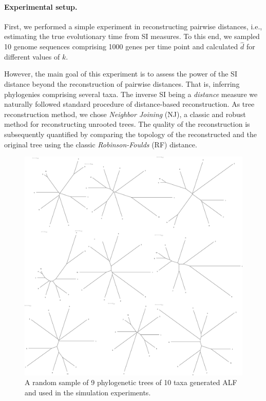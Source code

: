 \documentclass[9pt,english,utf8]{article}
\begin{document}
\paragraph{Experimental setup.}
First, we performed a simple experiment in reconstructing pairwise distances,
i.e., estimating the true evolutionary time from SI measures. To this end, we
sampled 10 genome sequences comprising 1000 genes per time point and calculated
$\hat d$ for different values of $k$.  

However, the main goal of this experiment is to assess the power of the SI
distance beyond the reconstruction of pairwise distances. That is, inferring
phylogenies comprising several taxa. The inverse SI being a \emph{distance}
measure we naturally followed standard procedure of distance-based
reconstruction. As tree reconstruction method, we chose \emph{Neighbor
Joining} (NJ), a classic and robust method for reconstructing unrooted trees.
The quality of the reconstruction is subsequently quantified by comparing the
topology of the reconstructed and the original tree using the classic
\emph{Robinson-Foulds} (RF) distance.  

\FloatBarrier

\begin{figure}[tbh]
    \centering \includegraphics[width=\columnwidth]{true_trees_s10_pam10}

    \caption{A random sample of 9 phylogenetic trees of 10 taxa generated ALF
    and used in the simulation experiments.}
    \label{fig:tree}
\end{figure}
\end{document}

